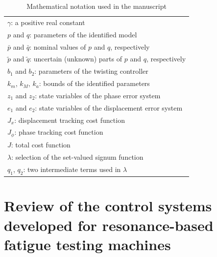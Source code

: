 \documentclass[lettersize,journal]{IEEEtran}
\begin{document}
\begin{table}[h]
\begin{tabular}{|l|}
$\gamma$: a positive real constant \\
$p$ and $q$: parameters of the identified model \\
$\bar{p}$ and $\bar{q}$: nominal values of $p$ and $q$, respectively \\
$\tilde{p}$ and $\tilde{q}$: uncertain (unknown) parts of $p$ and $q$, respectively \\
$b_1$ and $b_2$: parameters of the twisting controller \\
$k_m$, $k_M$, $k_a$: bounds of the identified parameters \\
$z_1$ and $z_2$: state variables of the phase error system \\
$e_1$ and $e_2$: state variables of the displacement error system \\
$J_x$: displacement tracking cost function \\
 $J_\phi$: phase tracking cost function \\
$J$: total cost function \\
$\lambda$: selection of the set-valued signum function \\
$q_1$, $q_2$: two intermediate terms used in $\lambda$ \\
\hline
    \end{tabular}
    \vspace{0.1cm}
    \caption{Mathematical notation used in the manuscript}
    \label{T_notation}
\end{table}


\section{Review of the control systems developed for resonance-based fatigue testing machines} \label{S_control_system}
\end{document}
